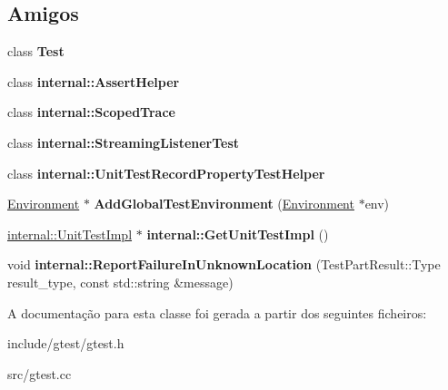 \subsection*{Amigos}
\begin{DoxyCompactItemize}
\item 
\hypertarget{classtesting_1_1UnitTest_a5b78b1c2e1fa07ffed92da365593eaa4}{class {\bfseries Test}}\label{classtesting_1_1UnitTest_a5b78b1c2e1fa07ffed92da365593eaa4}

\item 
\hypertarget{classtesting_1_1UnitTest_a183151aa061362c87572e743fe233db1}{class {\bfseries internal\-::\-Assert\-Helper}}\label{classtesting_1_1UnitTest_a183151aa061362c87572e743fe233db1}

\item 
\hypertarget{classtesting_1_1UnitTest_afa3927576c08d7b1e197ba16b2b3dcb7}{class {\bfseries internal\-::\-Scoped\-Trace}}\label{classtesting_1_1UnitTest_afa3927576c08d7b1e197ba16b2b3dcb7}

\item 
\hypertarget{classtesting_1_1UnitTest_adc037d188dab349a94868991955c9cd4}{class {\bfseries internal\-::\-Streaming\-Listener\-Test}}\label{classtesting_1_1UnitTest_adc037d188dab349a94868991955c9cd4}

\item 
\hypertarget{classtesting_1_1UnitTest_ae970f89a9f477a349fe5778be85ef42e}{class {\bfseries internal\-::\-Unit\-Test\-Record\-Property\-Test\-Helper}}\label{classtesting_1_1UnitTest_ae970f89a9f477a349fe5778be85ef42e}

\item 
\hypertarget{classtesting_1_1UnitTest_a5ec26e4c31220ff8e769cc09689a4d6d}{\hyperlink{classtesting_1_1Environment}{Environment} $\ast$ {\bfseries Add\-Global\-Test\-Environment} (\hyperlink{classtesting_1_1Environment}{Environment} $\ast$env)}\label{classtesting_1_1UnitTest_a5ec26e4c31220ff8e769cc09689a4d6d}

\item 
\hypertarget{classtesting_1_1UnitTest_a56e56be7066957d612e53b5c60f6ac08}{\hyperlink{classtesting_1_1internal_1_1UnitTestImpl}{internal\-::\-Unit\-Test\-Impl} $\ast$ {\bfseries internal\-::\-Get\-Unit\-Test\-Impl} ()}\label{classtesting_1_1UnitTest_a56e56be7066957d612e53b5c60f6ac08}

\item 
\hypertarget{classtesting_1_1UnitTest_a73f5a158c13793b90c80d854c9a75120}{void {\bfseries internal\-::\-Report\-Failure\-In\-Unknown\-Location} (Test\-Part\-Result\-::\-Type result\-\_\-type, const std\-::string \&message)}\label{classtesting_1_1UnitTest_a73f5a158c13793b90c80d854c9a75120}

\end{DoxyCompactItemize}


A documentação para esta classe foi gerada a partir dos seguintes ficheiros\-:\begin{DoxyCompactItemize}
\item 
include/gtest/gtest.\-h\item 
src/gtest.\-cc\end{DoxyCompactItemize}
